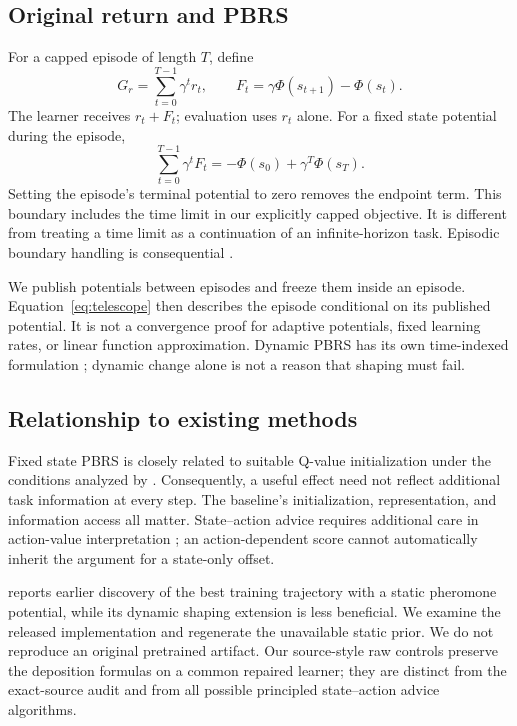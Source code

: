 \documentclass[10pt,twocolumn,letterpaper]{article}
\begin{document}
\subsection{Original return and PBRS}
For a capped episode of length $T$, define
\begin{equation}
 G_r=\sum_{t=0}^{T-1}\gamma^t r_t,\qquad
 F_t=\gamma\Phi(s_{t+1})-\Phi(s_t).
 \label{eq:pbrs}
\end{equation}
The learner receives $r_t+F_t$; evaluation uses $r_t$ alone. For a fixed state potential during the episode,
\begin{equation}
 \sum_{t=0}^{T-1}\gamma^tF_t=-\Phi(s_0)+\gamma^T\Phi(s_T).
 \label{eq:telescope}
\end{equation}
Setting the episode's terminal potential to zero removes the endpoint term. This boundary includes the time limit in our explicitly capped objective. It is different from treating a time limit as a continuation of an infinite-horizon task. Episodic boundary handling is consequential \citep{grzes2017}.

We publish potentials between episodes and freeze them inside an episode. Equation~\ref{eq:telescope} then describes the episode conditional on its published potential. It is not a convergence proof for adaptive potentials, fixed learning rates, or linear function approximation. Dynamic PBRS has its own time-indexed formulation \citep{devlin2012}; dynamic change alone is not a reason that shaping must fail.

\subsection{Relationship to existing methods}
Fixed state PBRS is closely related to suitable Q-value initialization under the conditions analyzed by \citet{wiewiora2003}. Consequently, a useful effect need not reflect additional task information at every step. The baseline's initialization, representation, and information access all matter. State--action advice requires additional care in action-value interpretation \citep{advice2003}; an action-dependent score cannot automatically inherit the argument for a state-only offset.

\citet{bromuri2019} reports earlier discovery of the best training trajectory with a static pheromone potential, while its dynamic shaping extension is less beneficial. We examine the released implementation and regenerate the unavailable static prior. We do not reproduce an original pretrained artifact. Our source-style raw controls preserve the deposition formulas on a common repaired learner; they are distinct from the exact-source audit and from all possible principled state--action advice algorithms.
\end{document}
